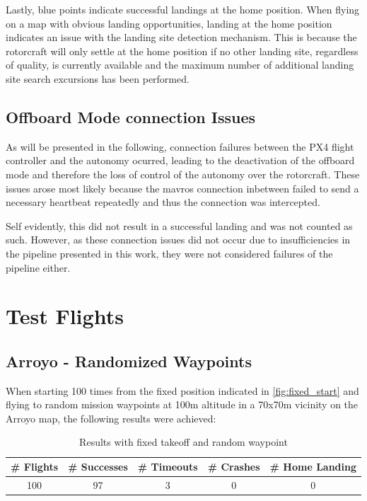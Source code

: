 Lastly, blue points indicate successful landings at the home position. When flying on a map with obvious landing opportunities, landing at the home position indicates an issue with the landing site detection mechanism. This is because the rotorcraft will only settle at the home position if no other landing site, regardless of quality, is currently available and the maximum number of additional landing site search excursions%
 has been performed.

\subsection{Offboard Mode connection Issues}
As will be presented in the following, connection failures between the PX4 flight controller and the autonomy ocurred, leading to the deactivation of the offboard mode and therefore the loss of control of the autonomy over the rotorcraft. These issues arose most likely because the mavros connection inbetween failed to send a necessary heartbeat repeatedly and thus the connection was intercepted.

Self evidently, this did not result in a successful landing and was not counted as such. However, as these connection issues did not occur due to insufficiencies in the pipeline presented in this work, they were not considered failures of the pipeline either.
\clearpage
\section{Test Flights}
\subsection{Arroyo - Randomized Waypoints}

When starting 100 times from the fixed position indicated in \cref{fig:fixed_start} and flying to random mission waypoints at 100m altitude in a 70x70m vicinity on the Arroyo map, the following results were achieved:

\begin{table}[h]
    \begin{center}
     \caption{Results with fixed takeoff and random waypoint}\vspace{1ex}
     \label{tab:result_random_waypoint}
     \begin{tabular}{|c|c|c|c|c|}
     \hline
     \# Flights & \# Successes & \# Timeouts & \# Crashes & \# Home Landing\\ \hline \hline
     100 & 97 & 3 & 0 & 0 \\%
     \hline
     \end{tabular}
    \end{center}
    \end{table}

